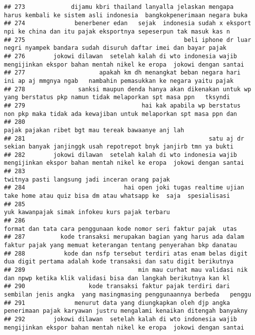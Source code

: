 \documentclass[
]{article}
\begin{document}
\begin{verbatim}
## 273             dijamu kbri thailand lanyalla jelaskan mengapa harus kembali ke sistem asli indonesia  bangkokpenerimaan negara buka
## 274              benerbener edan   sejak  indonesia sudah x eksport npi ke china dan itu pajak eksportnya sepeserpun tak masuk kas n
## 275                                             beli iphone dr luar negri nyampek bandara sudah disuruh daftar imei dan bayar pajak 
## 276        jokowi dilawan  setelah kalah di wto indonesia wajib mengijinkan ekspor bahan mentah nikel ke eropa  jokowi dengan santai
## 277                     apakah km dh menangkat beban negara hari ini ap aj mmgnya ngab   nambahin pemasukkan ke negara yaitu pajak  
## 278               sanksi maupun denda hanya akan dikenakan untuk wp yang berstatus pkp namun tidak melaporkan spt masa ppn   tksyndi
## 279                                 hai kak apabila wp berstatus non pkp maka tidak ada kewajiban untuk melaporkan spt masa ppn dan 
## 280                                                                              pajak pajakan ribet bgt mau tereak bawaanye anj lah
## 281                                                    satu aj dr sekian banyak janjinggk usah repotrepot bnyk janjirb tmn ya bukti 
## 282        jokowi dilawan  setelah kalah di wto indonesia wajib mengijinkan ekspor bahan mentah nikel ke eropa  jokowi dengan santai
## 283                                                                                  twitnya pasti langsung jadi inceran orang pajak
## 284                            hai open joki tugas realtime ujian take home atau quiz bisa dm atau whatsapp ke  saja  spesialisasi  
## 285                                                                                yuk kawanpajak simak infokeu kurs pajak terbaru  
## 286                                                              format dan tata cara penggunaan kode nomor seri faktur pajak  utas 
## 287          kode transaksi merupakan bagian yang harus ada dalam faktur pajak yang memuat keterangan tentang penyerahan bkp danatau
## 288           kode dan nsfp tersebut terdiri atas enam belas digit dua digit pertama adalah kode transaksi dan satu digit berikutnya
## 289                                min mau curhat mau validasi nik dan npwp ketika klik validasi bisa dan langkah berikutnya kan kl 
## 290                  kode transaksi faktur pajak terdiri dari sembilan jenis angka  yang masingmasing penggunaannya berbeda   penggu
## 291              menurut data yang diungkapkan oleh djp angka penerimaan pajak karyawan justru mengalami kenaikan ditengah banyakny 
## 292        jokowi dilawan  setelah kalah di wto indonesia wajib mengijinkan ekspor bahan mentah nikel ke eropa  jokowi dengan santai

\end{verbatim}
\end{document}
